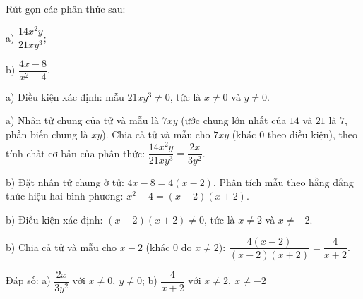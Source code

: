 \begin{problem}[8DS-PS-033]
Rút gọn các phân thức sau:

a) $\dfrac{14x^2y}{21xy^3}$;

b) $\dfrac{4x - 8}{x^2 - 4}$.

\begin{solution}
a) Điều kiện xác định: mẫu $21xy^3 \neq 0$, tức là $x \neq 0$ và $y \neq 0$.

a) Nhân tử chung của tử và mẫu là $7xy$ (ước chung lớn nhất của $14$ và $21$ là $7$, phần biến chung là $xy$). Chia cả tử và mẫu cho $7xy$ (khác $0$ theo điều kiện), theo tính chất cơ bản của phân thức: $\dfrac{14x^2y}{21xy^3} = \dfrac{2x}{3y^2}$.

b) Đặt nhân tử chung ở tử: $4x - 8 = 4(x - 2)$. Phân tích mẫu theo hằng đẳng thức hiệu hai bình phương: $x^2 - 4 = (x - 2)(x + 2)$.

b) Điều kiện xác định: $(x - 2)(x + 2) \neq 0$, tức là $x \neq 2$ và $x \neq -2$.

b) Chia cả tử và mẫu cho $x - 2$ (khác $0$ do $x \neq 2$): $\dfrac{4(x - 2)}{(x - 2)(x + 2)} = \dfrac{4}{x + 2}$.

Đáp số: a) $\boxed{\dfrac{2x}{3y^2} \text{ với } x \neq 0,\ y \neq 0}$; b) $\boxed{\dfrac{4}{x + 2} \text{ với } x \neq 2,\ x \neq -2}$
\end{solution}
\end{problem}

